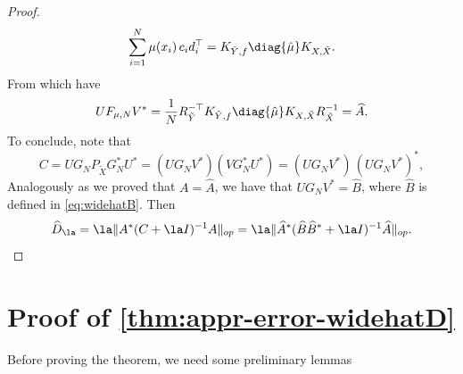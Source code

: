 \begin{proof}
$$ \sum_{i=1}^N \mu(x_i) \, c_i d_i^\top   = K_{\tilde{Y},f}\diag{\hat{\mu}}K_{X,\tilde{X}}.$$
From which have
$$
U F_{\mu, N} V^* = \frac{1}{N}R^{-\top}_{\tilde Y} K_{\tilde{Y},f}\diag{\hat{\mu}}K_{X,\tilde{X}} R^{-1}_{\tilde X} = \widehat{A}.
$$
To conclude, note that
$$C = U G_N P_{\tilde{X}} G_N^* U^* = (U G_N V^*) (V G_N^* U^*) = (U G_N V^*)\,(U G_N V^*)^*  ,$$
Analogously as we proved that $A = \widehat{A}$, we have that $U G_N V^* = \widehat{B}$, where $\widehat{B}$ is defined in \cref{eq:widehatB}. Then
$$\widehat{D}_\la = \la \|A^* (C + \la I)^{-1} A \|_{op} = \la \|\widehat{A}^* (\widehat{B}\widehat{B}^* + \la I)^{-1} \widehat{A} \|_{op}.$$
\end{proof}


\section{Proof of \cref{thm:appr-error-widehatD}}

Before proving the theorem, we need some preliminary lemmas

